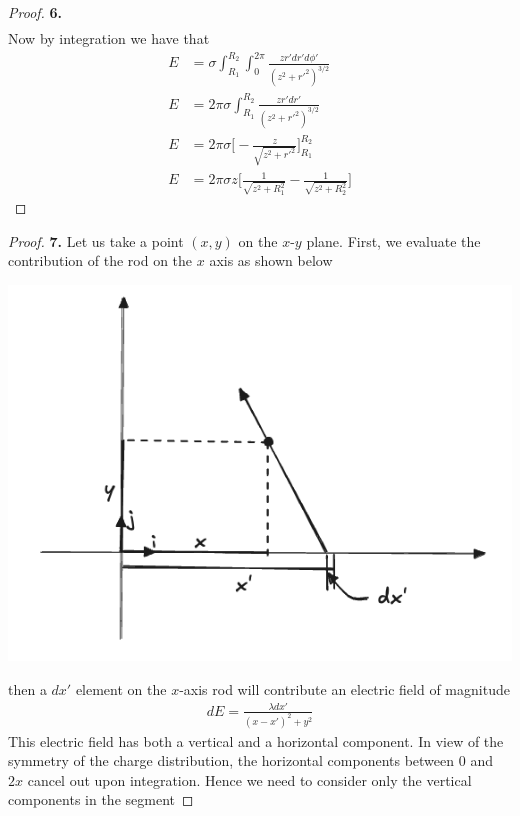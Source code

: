 \documentclass[11pt]{article}
\theoremstyle{definition}
\begin{document}
\begin{proof}{\textbf{6.}}
\begin{align*}
    \end{align*}
    Now by integration we have that
    \begin{align*}
        E &= \sigma \int_{R_1}^{R_2} \int_{0}^{2\pi}
        \frac{ zr' dr' d\phi'}{(z^2 + r'^2)^{3/2}}\\
        E &= 2\pi \sigma \int_{R_1}^{R_2}
        \frac{ zr' dr'}{(z^2 + r'^2)^{3/2}}\\
        E &= 2\pi \sigma \bigg[-\frac{z}{\sqrt{z^2 + r'^2}}\bigg]_{R_1}^{R_2}\\
        E &= 2\pi \sigma z \bigg[\frac{1}{\sqrt{z^2 + R_1^2}}
        -\frac{1}{\sqrt{z^2 + R_2^2}}\bigg]
    \end{align*}

\end{proof}
\begin{proof}{\textbf{7.}}
    Let us take a point $(x,y)$ on the $x$-$y$ plane.
    First, we evaluate the contribution of the rod on the $x$ axis as shown below
    \begin{center}
        \includegraphics*[scale=0.4]{ch2-7.png}
    \end{center}
    then a $dx'$ element on the $x$-axis rod will contribute an electric field
    of magnitude
    \begin{align*}
        dE = \frac{\lambda dx'}{(x - x')^2 + y^2}
    \end{align*}
    This electric field has both a vertical and a horizontal component.
    In view of the symmetry of the charge distribution, the horizontal
    components between 0 and $2x$ cancel out upon integration.
    Hence we need to consider only the vertical components in the segment

\end{proof}
\end{document}
